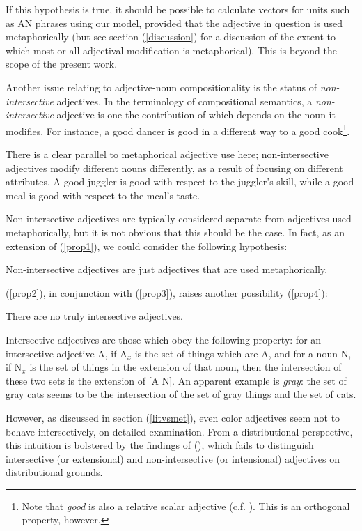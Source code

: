 \documentclass[10pt,letterpaper,twocolumn]{article}
\begin{document}
If this hypothesis is true, it should be possible to calculate vectors for units such as AN phrases using our model, provided that the adjective in question is used metaphorically (but see section (\ref{discussion}) for a discussion of the extent to which most or all adjectival modification is metaphorical). This is beyond the scope of the present work.


Another issue relating to adjective-noun compositionality is the status of \emph{non-intersective} adjectives. In the terminology of compositional semantics, a \emph{non-intersective} adjective is one the contribution of which depends on the noun it modifies. For instance, a good dancer is good in a different way to a good cook\footnote{Note that \emph{good} is also a relative scalar adjective (c.f. \cite{kennedy}). This is an orthogonal property, however.}. 

There is a clear parallel to metaphorical adjective use here; non-intersective adjectives modify different nouns differently, as a result of focusing on different attributes. A good juggler is good with respect to the juggler's skill, while a good meal is good with respect to the meal's taste.

Non-intersective adjectives are typically considered separate from adjectives used metaphorically, but it is not obvious that this should be the case. In fact, as an extension of (\ref{prop1}), we could consider the following hypothesis:

\begin{exe}
\ex Non-intersective adjectives are just adjectives that are used metaphorically. \label{prop2}
\end{exe}

(\ref{prop2}), in conjunction with (\ref{prop3}), raises another possibility (\ref{prop4}):

\begin{exe}
\ex There are no truly intersective adjectives. \label{prop4}
\end{exe}

Intersective adjectives are those which obey the following property: for an intersective adjective A, if A$_x$ is the set of things which are A, and for a noun N, if N$_x$ is the set of things in the extension of that noun, then the intersection of these two sets is the extension of [A N]. An apparent example is \emph{gray}: the set of gray cats seems to be the intersection of the set of gray things and the set of cats.

However, as discussed in section (\ref{litvsmet}), even color adjectives seem not to behave intersectively, on detailed examination. From a distributional perspective, this intuition is bolstered by the findings of (\cite{boleda}), which fails to distinguish intersective (or extensional) and non-intersective (or intensional) adjectives on distributional grounds.
\end{document}
